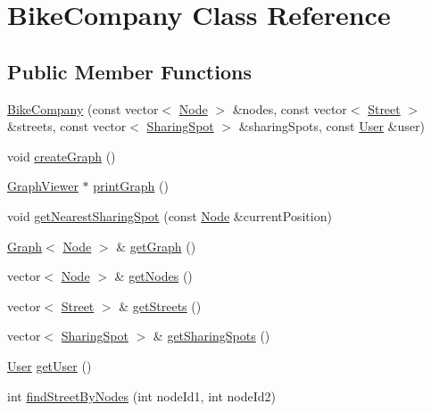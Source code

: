 \hypertarget{class_bike_company}{}\section{Bike\+Company Class Reference}
\label{class_bike_company}
\subsection*{Public Member Functions}
\begin{DoxyCompactItemize}
\item 
\mbox{\hyperlink{class_bike_company_ab435a4495b3ae8602162a51ebf50a3f4}{Bike\+Company}} (const vector$<$ \mbox{\hyperlink{class_node}{Node}} $>$ \&nodes, const vector$<$ \mbox{\hyperlink{class_street}{Street}} $>$ \&streets, const vector$<$ \mbox{\hyperlink{class_sharing_spot}{Sharing\+Spot}} $>$ \&sharing\+Spots, const \mbox{\hyperlink{class_user}{User}} \&user)
\item 
void \mbox{\hyperlink{class_bike_company_ace655ae1ace35afcb0acb4ae842215df}{create\+Graph}} ()
\item 
\mbox{\hyperlink{class_graph_viewer}{Graph\+Viewer}} $\ast$ \mbox{\hyperlink{class_bike_company_a5cdaee132eda4772a117b7f36cb94de3}{print\+Graph}} ()
\item 
void \mbox{\hyperlink{class_bike_company_ae7994d9db29de7064da710915662bd0b}{get\+Nearest\+Sharing\+Spot}} (const \mbox{\hyperlink{class_node}{Node}} \&current\+Position)
\item 
\mbox{\hyperlink{class_graph}{Graph}}$<$ \mbox{\hyperlink{class_node}{Node}} $>$ \& \mbox{\hyperlink{class_bike_company_ab60253ec9b0bb46f913609a189df4cb8}{get\+Graph}} ()
\item 
vector$<$ \mbox{\hyperlink{class_node}{Node}} $>$ \& \mbox{\hyperlink{class_bike_company_ae41458919c4daf896b12960c2b43d51c}{get\+Nodes}} ()
\item 
vector$<$ \mbox{\hyperlink{class_street}{Street}} $>$ \& \mbox{\hyperlink{class_bike_company_a545b86c3c1dbde4b8f70871b4d23be2b}{get\+Streets}} ()
\item 
vector$<$ \mbox{\hyperlink{class_sharing_spot}{Sharing\+Spot}} $>$ \& \mbox{\hyperlink{class_bike_company_ac361f971df61155a1763c682b28f6297}{get\+Sharing\+Spots}} ()
\item 
\mbox{\hyperlink{class_user}{User}} \mbox{\hyperlink{class_bike_company_a19f8b3503630ec5f5c12ead35cdbe995}{get\+User}} ()
\item 
int \mbox{\hyperlink{class_bike_company_a70a2863261f0b9b2087c2ed012a17434}{find\+Street\+By\+Nodes}} (int node\+Id1, int node\+Id2)

\end{DoxyCompactItemize}

